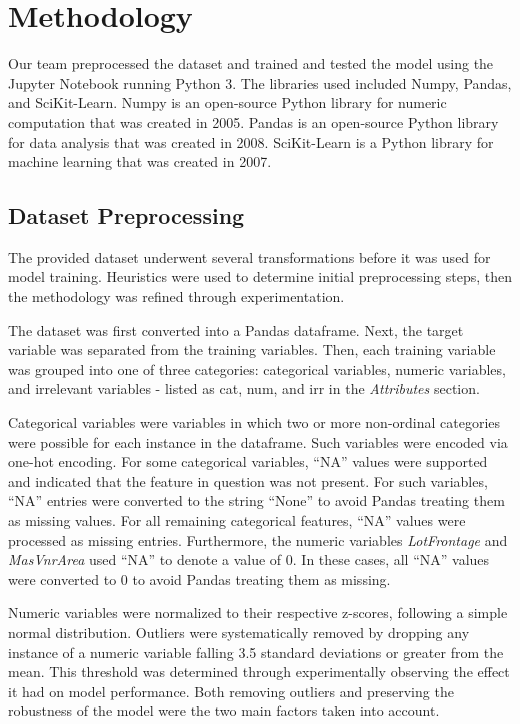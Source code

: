 \documentclass[12pt]{article}
\begin{document}
\section*{Methodology}
\par \qquad Our team preprocessed the dataset and trained and tested the model using the Jupyter Notebook running Python 3. The libraries used included Numpy, Pandas, and SciKit-Learn. Numpy is an open-source Python library for numeric computation that was created in 2005. Pandas is an open-source Python library for data analysis that was created in 2008. SciKit-Learn is a Python library for machine learning that was created in 2007.

\subsection{Dataset Preprocessing}
\par \qquad The provided dataset underwent several transformations before it was used for model training. Heuristics were used to determine initial preprocessing steps, then the methodology was refined through experimentation.
\par The dataset was first converted into a Pandas dataframe. Next, the target variable was separated from the training variables. Then, each training variable was grouped into one of three categories: categorical variables, numeric variables, and irrelevant variables - listed as cat, num, and irr in the \emph{Attributes} section.
\par Categorical variables were variables in which two or more non-ordinal categories were possible for each instance in the dataframe. Such variables were encoded via one-hot encoding. For some categorical variables, “NA” values were supported and indicated that the feature in question was not present.  For such variables, “NA” entries were converted to the string “None” to avoid Pandas treating them as missing values. For all remaining categorical features, “NA” values were processed as missing entries. Furthermore, the numeric variables \emph{LotFrontage} and \emph{MasVnrArea} used “NA” to denote a value of 0. In these cases, all “NA” values were converted to 0 to avoid Pandas treating them as missing. 
\par Numeric variables were normalized to their respective z-scores, following a simple normal distribution. Outliers were systematically removed by dropping any instance of a numeric variable falling 3.5 standard deviations or greater from the mean. This threshold was determined through experimentally observing the effect it had on model performance. Both removing outliers and preserving the robustness of the model were the two main factors taken into account.
\end{document}
